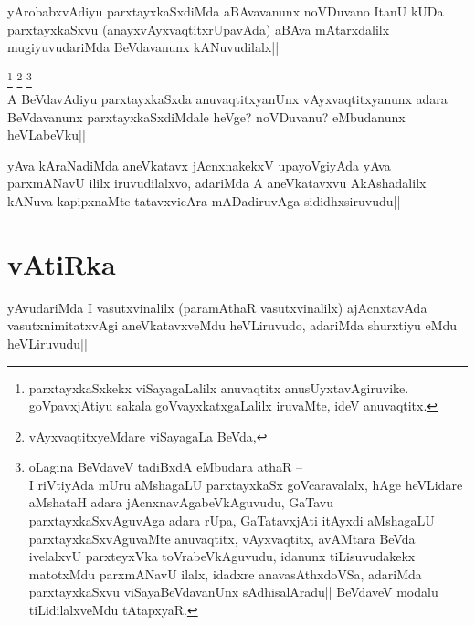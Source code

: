 
\begin{artha} 
yArobabxvAdiyu parxtayxkaSxdiMda aBAvavanunx noVDuvano ItanU kUDa 
parxtayxkaSxvu (anayxvAyxvaqtitxrUpavAda) aBAva mAtarxdalilx 
mugiyuvudariMda BeVdavanunx kANuvudilalx||
\end{artha}


\begin{artha}
\footnote[1]{parxtayxkaSxkekx viSayagaLalilx anuvaqtitx 
anusUyxtavAgiruvike. goVpavxjAtiyu sakala goVvayxkatxgaLalilx 
iruvaMte, ideV anuvaqtitx.}
\footnote[2]{vAyxvaqtitxyeMdare viSayagaLa BeVda,}
\footnote[3]{oLagina BeVdaveV tadiBxdA eMbudara athaR --\\ I riVtiyAda 
mUru aMshagaLU parxtayxkaSx goVcaravalalx, hAge heVLidare aMshataH 
adara jAcnxnavAgabeVkAguvudu, GaTavu parxtayxkaSxvAguvAga adara rUpa, 
GaTatavxjAti itAyxdi aMshagaLU parxtayxkaSxvAguvaMte anuvaqtitx, 
vAyxvaqtitx, avAMtara BeVda ivelalxvU parxteyxVka toVrabeVkAguvudu, 
idanunx tiLisuvudakekx matotxMdu parxmANavU ilalx, idadxre 
anavasAthxdoVSa, adariMda parxtayxkaSxvu viSayaBeVdavanUnx 
sAdhisalAradu|| BeVdaveV modalu tiLidilalxveMdu tAtapxyaR.}\\
A BeVdavAdiyu parxtayxkaSxda anuvaqtitxyanUnx vAyxvaqtitxyanunx adara 
BeVdavanunx parxtayxkaSxdiMdale heVge? noVDuvanu? eMbudanunx 
heVLabeVku||
\end{artha}


\begin{artha} 
yAva kAraNadiMda aneVkatavx jAcnxnakekxV upayoVgiyAda yAva parxmANavU 
ililx iruvudilalxvo, adariMda A aneVkatavxvu AkAshadalilx kANuva 
kapipxnaMte tatavxvicAra mADadiruvAga sididhxsiruvudu||
\end{artha}

\section*{vAtiRka}

\begin{artha} 
yAvudariMda I vasutxvinalilx (paramAthaR vasutxvinalilx) ajAcnxtavAda 
vasutxnimitatxvAgi aneVkatavxveMdu heVLiruvudo, adariMda shurxtiyu 
\stext eMdu heVLiruvudu||
\end{artha}

